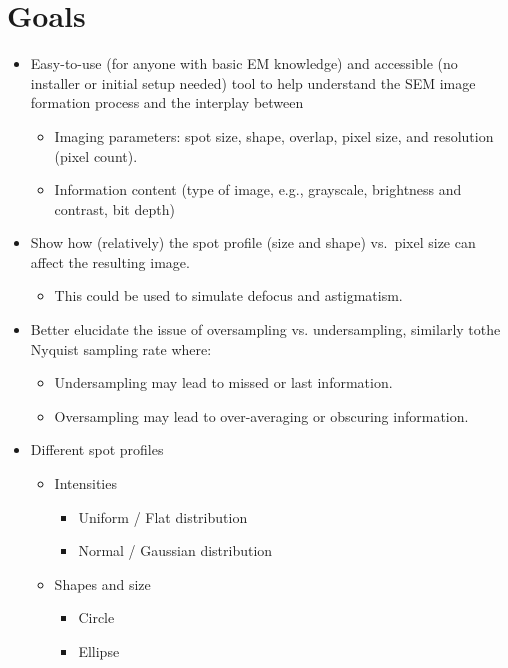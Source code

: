 \documentclass{article}
\begin{document}
\section{Goals}
\begin{itemize}
  \item Easy-to-use (for anyone with basic EM knowledge) and accessible (no
  installer or initial setup needed) tool to help understand the SEM image
  formation process and the interplay between
  \begin{itemize}
  \item Imaging parameters: spot size, shape, overlap, pixel size, and resolution
  (pixel count).
  \item Information content (type of image, e.g., grayscale, brightness and
  contrast, bit depth)
  \end{itemize}
  \item Show how (relatively) the spot profile (size and shape) vs.\ pixel size
  can affect the resulting image.
  \begin{itemize}
    \item This could be used to simulate defocus and astigmatism.
  \end{itemize}
  \item Better elucidate the issue of oversampling vs. undersampling, similarly
  tothe Nyquist sampling rate where:
  \begin{itemize}
    \item Undersampling may lead to missed or last information.
    \item Oversampling may lead to over-averaging or obscuring information.
  \end{itemize}
  \item Different spot profiles
  \begin{itemize}
    \item Intensities
    \begin{itemize}
    \item Uniform / Flat distribution
    \item Normal / Gaussian distribution
    \end{itemize}
    \item Shapes and size
    \begin{itemize}
    \item Circle
    \item Ellipse
    \end{itemize}
  \end{itemize}
\end{itemize}
\end{document}
